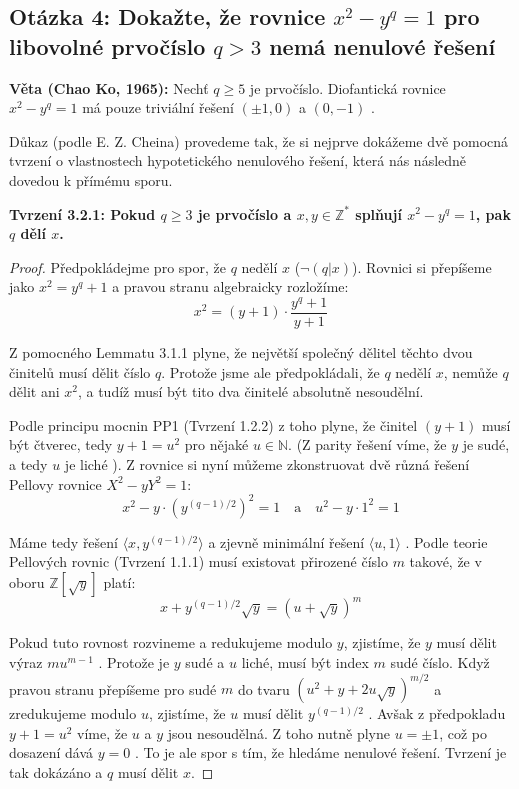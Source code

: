 \documentclass[a4paper,12pt]{article}
\begin{document}
\subsection*{Otázka 4: Dokažte, že rovnice $x^2 - y^q = 1$ pro libovolné prvočíslo $q > 3$ nemá nenulové řešení}

\textbf{Věta (Chao Ko, 1965):} Nechť $q \ge 5$ je prvočíslo. Diofantická rovnice $x^2 - y^q = 1$ má pouze triviální řešení $(\pm 1, 0)$ a $(0, -1)$ .

Důkaz (podle E. Z. Cheina) provedeme tak, že si nejprve dokážeme dvě pomocná tvrzení o vlastnostech hypotetického nenulového řešení, která nás následně dovedou k přímému sporu.

\vspace{1em}
\textbf{Tvrzení 3.2.1: Pokud $q \ge 3$ je prvočíslo a $x, y \in \mathbb{Z}^*$ splňují $x^2 - y^q = 1$, pak $q$ dělí $x$.}
\vspace{0.5em}
\begin{proof}
Předpokládejme pro spor, že $q$ nedělí $x$ ($\neg(q|x)$). Rovnici si přepíšeme jako $x^2 = y^q + 1$ a pravou stranu algebraicky rozložíme:
$$x^2 = (y + 1) \cdot \frac{y^q + 1}{y + 1} $$

Z pomocného Lemmatu 3.1.1 plyne, že největší společný dělitel těchto dvou činitelů musí dělit číslo $q$. Protože jsme ale předpokládali, že $q$ nedělí $x$, nemůže $q$ dělit ani $x^2$, a tudíž musí být tito dva činitelé absolutně nesoudělní. 

Podle principu mocnin PP1 (Tvrzení 1.2.2) z toho plyne, že činitel $(y + 1)$ musí být čtverec, tedy $y + 1 = u^2$ pro nějaké $u \in \mathbb{N}$. (Z parity řešení víme, že $y$ je sudé, a tedy $u$ je liché ). Z rovnice si nyní můžeme zkonstruovat dvě různá řešení Pellovy rovnice $X^2 - yY^2 = 1$:
$$x^2 - y \cdot (y^{(q-1)/2})^2 = 1 \quad \text{a} \quad u^2 - y \cdot 1^2 = 1 $$

Máme tedy řešení $\langle x, y^{(q-1)/2} \rangle$ a zjevně minimální řešení $\langle u, 1 \rangle$ . Podle teorie Pellových rovnic (Tvrzení 1.1.1) musí existovat přirozené číslo $m$ takové, že v oboru $\mathbb{Z}[\sqrt{y}]$ platí:
$$x + y^{(q-1)/2}\sqrt{y} = (u + \sqrt{y})^m $$

Pokud tuto rovnost rozvineme a redukujeme modulo $y$, zjistíme, že $y$ musí dělit výraz $m u^{m-1}$ . Protože je $y$ sudé a $u$ liché, musí být index $m$ sudé číslo. 
Když pravou stranu přepíšeme pro sudé $m$ do tvaru $(u^2 + y + 2u\sqrt{y})^{m/2}$ a zredukujeme modulo $u$, zjistíme, že $u$ musí dělit $y^{(q-1)/2}$ . 
Avšak z předpokladu $y + 1 = u^2$ víme, že $u$ a $y$ jsou nesoudělná. Z toho nutně plyne $u = \pm 1$, což po dosazení dává $y = 0$ . To je ale spor s tím, že hledáme nenulové řešení. Tvrzení je tak dokázáno a $q$ musí dělit $x$.
\end{proof}
\end{document}
